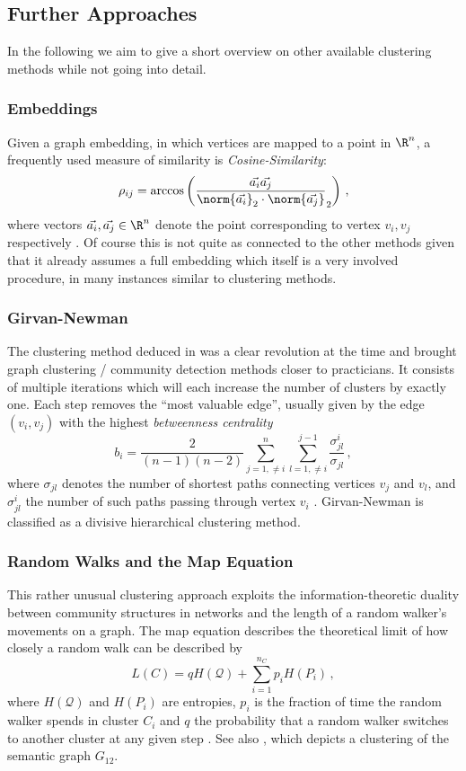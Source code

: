 \documentclass[12pt, a4paper]{article}
\begin{document}
  \subsection{Further Approaches}
  In the following we aim to give a short overview on other available clustering methods while not going into detail.

  \subsubsection{Embeddings}
  Given a graph embedding, in which vertices are mapped to a point in $\R^n$, a frequently used measure of similarity is \textit{Cosine-Similarity}:
  $$\rho_{ij} = \arccos\left(\frac{\vec{a_i} \vec{a_j}}{\norm{\vec{a_i}}_2 \cdot \norm{\vec{a_j}}}_2\right)\,,$$
  where vectors $\vec{a_i}, \vec{a_j} \in \R^n$ denote the point corresponding to vertex $v_i, v_j$ respectively \parencite{fortunato}.
  Of course this is not quite as connected to the other methods given that it already assumes a full embedding which itself is a very involved procedure, in many instances similar to clustering methods.

  \subsubsection{Girvan-Newman}
  The clustering method deduced in \cite{girvan-newman} was a clear revolution at the time and brought graph clustering / community detection methods closer to practicians.
  It consists of multiple iterations which will each increase the number of clusters by exactly one. Each step removes the ``most valuable edge'', usually given by the edge $(v_i, v_j)$ with the highest \textit{betweenness centrality} $$b_i = \frac{2}{(n-1)(n-2)} \sum_{j=1, \neq i}^n \sum_{l=1, \neq i}^{j-1} \frac{\sigma_{jl}^{i}}{\sigma_{jl}}\,,$$ where $\sigma_{jl}$ denotes the number of shortest paths connecting vertices $v_j$ and $v_l$, and $\sigma_{jl}^i$ the number of such paths passing through vertex $v_i$ \parencite{grindrod-lecture-notes}.
  Girvan-Newman is classified as a divisive hierarchical clustering method.

  \subsubsection{Random Walks and the Map Equation}
  \label{sec:mapequation}
  This rather unusual clustering approach exploits the information-theoretic duality between community structures in networks and the length of a random walker's movements on a graph.
  The map equation describes the theoretical limit of how closely a random walk can be described by $$L(C) = q H(\mathcal{Q}) + \sum_{i=1}^{n_C} p_i H(P_i)\,,$$
  where $H(\mathcal{Q})$ and $H(P_i)$ are entropies, $p_i$ is the fraction of time the random walker spends in cluster $C_i$ and $q$ the probability that a random walker switches to another cluster at any given step \parencite{mapequation}.
  See also , which depicts a clustering of the semantic graph $G_{12}$.
\end{document}
